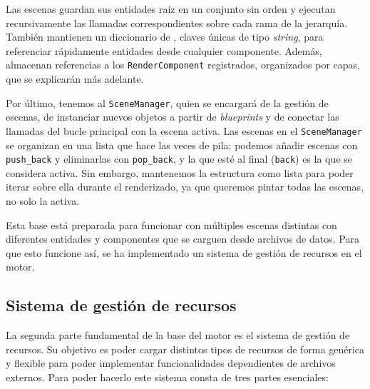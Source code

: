 \medskip

Las escenas guardan sus entidades raíz en un conjunto sin orden y ejecutan recursivamente las llamadas correspondientes sobre cada rama de la jerarquía. También mantienen un diccionario de , claves únicas de tipo \textit{string}, para referenciar rápidamente entidades desde cualquier componente. Además, almacenan referencias a los \texttt{RenderComponent} registrados, organizados por capas, que se explicarán más adelante. 

\medskip

Por último, tenemos al \texttt{SceneManager}, quien se encargará de la gestión de escenas, de instanciar nuevos objetos a partir de \textit{blueprints} y de conectar las llamadas del bucle principal con la escena activa. Las escenas en el \texttt{SceneManager} se organizan en una lista que hace las veces de pila: podemos añadir escenas con \texttt{push\_back} y eliminarlas con \texttt{pop\_back}, y la que esté al final (\texttt{back}) es la que se considera activa. Sin embargo, mantenemos la estructura como lista para poder iterar sobre ella durante el renderizado, ya que queremos pintar todas las escenas, no solo la activa.

\medskip

Esta base está preparada para funcionar con múltiples escenas distintas con diferentes entidades y componentes que se carguen desde archivos de datos. Para que esto funcione así, se ha implementado un sistema de gestión de recursos en el motor.

\subsection{Sistema de gestión de recursos}
La segunda parte fundamental de la base del motor es el sistema de gestión de recursos. Su objetivo es poder cargar distintos tipos de recursos de forma genérica y flexible para poder implementar funcionalidades dependientes de archivos externos. Para poder hacerlo este sistema consta de tres partes esenciales: 

